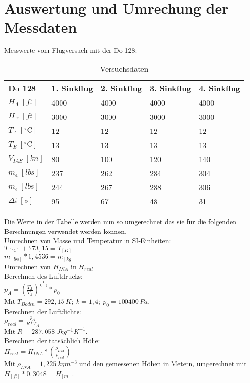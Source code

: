 \chapter{Auswertung und Umrechung der Messdaten}
\label{c:Auswertung}

Messwerte vom Flugversuch mit der Do 128: 

\begin{table}[h]
	\centering
	\begin{tabular}{| l | l | l | l | l | }
\hline
	Do 128 & 1. Sinkflug & 2. Sinkflug & 3. Sinkflug & 4. Sinkflug \\ \hline
	$H_A\ [ft]$ & 4000 & 4000 & 4000 & 4000 \\ \hline
	$H_E\ [ft]$  & 3000 & 3000 & 3000 & 3000 \\ \hline
	$T_A\ [^\circ\text{C}]$  & 12 & 12 & 12 & 12 \\ \hline
	$T_E\ [^\circ\text{C}]$  & 13 & 13 & 13 & 13 \\ \hline
	$V_{IAS}\ [kn]$ & 80 & 100 & 120 & 140 \\ \hline
	$m_a\ [lbs]$ & 237 & 262 & 284 & 304 \\ \hline
	$m_e\ [lbs]$ & 244 & 267 & 288 & 306 \\ \hline
	$\Delta t\ [s]$ & 95 & 67 & 48 & 31 \\ \hline
\end{tabular}
	\caption{Versuchsdaten}
	\label{tab:VersuchDaten2}
\end{table}
Die Werte in der Tabelle werden nun so umgerechnet das sie für die folgenden Berechnungen verwendet werden können.\\
Umrechnen von Masse und Temperatur in SI-Einheiten:\\


$T_{[^\circ\text{C}]}+273,15=T_{[K]}$\\
$m_{[lbs]}*0,4536=m_{[kg]}$\\

Umrechnen von $H_{INA}$ in $H_{real}$:\\
Berechnen des Luftdrucks:\\
$p_A=(\frac{T_A}{T_B})^ {\frac{k}{k-1}}*p_0$\\
Mit $T_{Boden}=292,15\ K;\ k=1,4;\ p_0=100400\ Pa$.\\
Berechnen der Luftdichte:\\
$\rho_{real}=\frac{p_A}{R*T_A}$\\
Mit $R=287,058\ Jkg^{-1}K^{-1}$.\\
Berechnen der tatsächlich Höhe:\\
$H_{real}=H_{INA}*\left(\frac{\rho _{INA}}{\rho _{real}}\right) $\\
Mit $\rho_{INA}=1,225\ kgm^{-3}$ und den gemessenen Höhen in Metern, umgerechnet mit
$H_{[ft]}*0,3048=H_{[m]} $.\\

